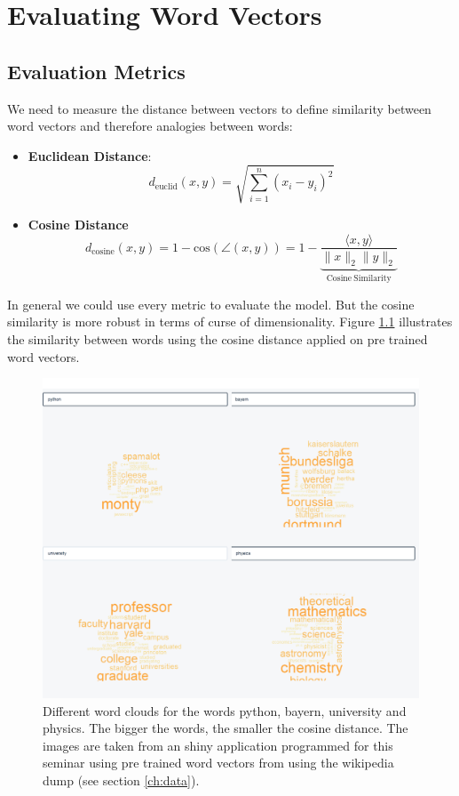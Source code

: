 \chapter{Evaluating Word Vectors}\label{ch:eval}

\section{Evaluation Metrics}

We need to measure the distance between vectors to define similarity between word vectors and therefore analogies between words:

\begin{itemize}
  \item 
    \textbf{Euclidean Distance}: 
    \[
      d_\mathrm{euclid}(x,y) = \sqrt{\sum\limits_{i=1}^n(x_i - y_i)^2}
    \]

  \item 
    \textbf{Cosine Distance}
    \[
      d_\mathrm{cosine}(x,y) = 1 - \mathrm{cos}(\angle (x, y)) = 
      1 - \underbrace{\frac{\langle x,y\rangle}{\|x\|_2\|y\|_2}}_{\mathrm{Cosine\ Similarity}}
    \]
\end{itemize}

In general we could use every metric to evaluate the model. But the 
cosine similarity is more robust in terms of curse of dimensionality.
Figure \ref{fig:wc} illustrates the similarity between words using the
cosine distance applied on pre trained word vectors.

\begin{figure}[!h]
\centering
\includegraphics[scale=0.5]{images/word_clouds.png} 
\caption[Different word clouds illustrating similarities.]{Different word clouds for the words python, bayern, university and physics. The bigger the words, the smaller the cosine distance. The images are taken from an shiny application programmed for this seminar using pre trained word vectors from \cite{pennington2014glove} using the wikipedia dump (see section \ref{ch:data}).}
\label{fig:wc}
\end{figure}

